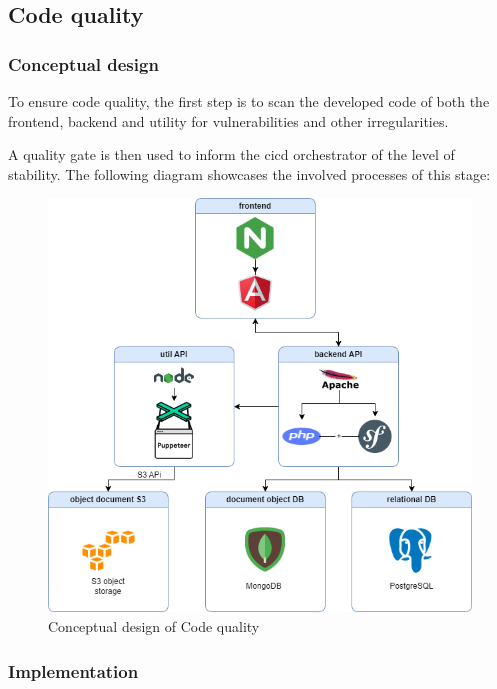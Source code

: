  
\subsection{Code quality }

\subsubsection{Conceptual design }

To ensure code quality, the first step is to scan the developed code of both the frontend, backend and utility for vulnerabilities and other irregularities.  

A quality gate is then used to inform the cicd orchestrator of the level of stability. The following diagram showcases the involved processes of this stage: 

\begin{figure}[H]\centering
\includegraphics[width=1.0\textwidth,angle=00]{assets/f47.png}
\caption{ Conceptual design of Code quality }
\label{fig:conceptual design of Code quality }
\end{figure}


\subsubsection{Implementation }

